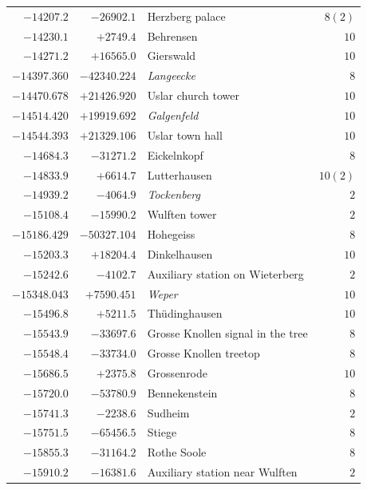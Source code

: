 \begin{center}
\begin{tabular}{r|r|p{170pt}|r}
\(-14207.2\)&\(-26902.1\)&Herzberg palace&\(8 (2)\)\\
\(-14230.1\)&\(+2749.4\)&Behrensen&\(10\)\\
\(-14271.2\)&\(+16565.0\)&Gierswald&\(10\)\\
\(-14397.360\)&\(-42340.224\)&\textit{Langeecke}&\(8\)\\
\(-14470.678\)&\(+21426.920\)&Uslar church tower&\(10\)\\
\(-14514.420\)&\(+19919.692\)&\textit{Galgenfeld}&\(10\)\\
\(-14544.393\)&\(+21329.106\)&Uslar town hall&\(10\)\\
\(-14684.3\)&\(-31271.2\)&Eickelnkopf&\(8\)\\
\(-14833.9\)&\(+6614.7\)&Lutterhausen&\(10 (2)\)\\
\(-14939.2\)&\(-4064.9\)&\textit{Tockenberg}&\(2\)\\
\(-15108.4\)&\(-15990.2\)&Wulften tower&\(2\)\\
\(-15186.429\)&\(-50327.104\)&Hohegeiss&\(8\)\\
\(-15203.3\)&\(+18204.4\)&Dinkelhausen&\(10\)\\
\(-15242.6\)&\(-4102.7\)&Auxiliary station on Wieterberg&\(2\)\\
\(-15348.043\)&\(+7590.451\)&\textit{Weper}&\(10\)\\
\(-15496.8\)&\(+5211.5\)&Thüdinghausen&\(10\)\\
\(-15543.9\)&\(-33697.6\)&Grosse Knollen signal in the tree&\(8\)\\
\(-15548.4\)&\(-33734.0\)&Grosse Knollen treetop&\(8\)\\
\(-15686.5\)&\(+2375.8\)&Grossenrode&\(10\)\\
\(-15720.0\)&\(-53780.9\)&Bennekenstein&\(8\)\\
\(-15741.3\)&\(-2238.6\)&Sudheim&\(2\)\\
\(-15751.5\)&\(-65456.5\)&Stiege&\(8\)\\
\(-15855.3\)&\(-31164.2\)&Rothe Soole&\(8\)\\
\(-15910.2\)&\(-16381.6\)&Auxiliary station near Wulften&\(2\)\\
\hline\end{tabular}\endgroup\end{center}
\clearpage
